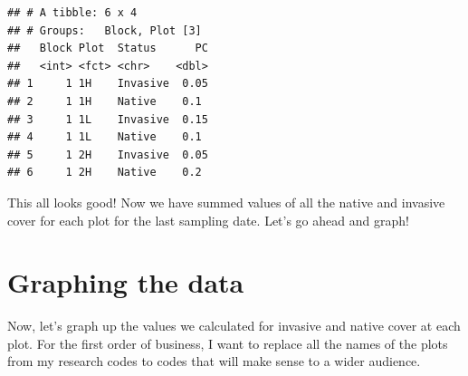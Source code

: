 \documentclass[
]{book}
\begin{document}
\begin{verbatim}
## # A tibble: 6 x 4
## # Groups:   Block, Plot [3]
##   Block Plot  Status      PC
##   <int> <fct> <chr>    <dbl>
## 1     1 1H    Invasive  0.05
## 2     1 1H    Native    0.1 
## 3     1 1L    Invasive  0.15
## 4     1 1L    Native    0.1 
## 5     1 2H    Invasive  0.05
## 6     1 2H    Native    0.2
\end{verbatim}

This all looks good! Now we have summed values of all the native and invasive cover for each plot for the last sampling date. Let's go ahead and graph!

\hypertarget{graphing-the-data}{%
\section{Graphing the data}\label{graphing-the-data}}

Now, let's graph up the values we calculated for invasive and native cover at each plot. For the first order of business, I want to replace all the names of the plots from my research codes to codes that will make sense to a wider audience.
\end{document}
